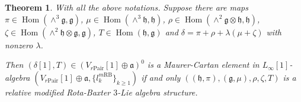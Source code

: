 \documentclass[12pt]{amsart}
\newtheorem{theorem}{Theorem}[section]
\theoremstyle{definition}
\begin{document}
\begin{theorem}\label{Thm: MC of modified relative RB}
	With all the above notations.     Suppose  there are maps $\pi\in \operatorname{Hom}(\wedge^3\mathfrak{g},\mathfrak{g})$, $\mu\in \operatorname{Hom}(\wedge^3\mathfrak{h},\mathfrak{h})$, $\rho\in \operatorname{Hom}(\wedge^2 \mathfrak{g}\otimes \mathfrak{h}  , \mathfrak{h})$, $\zeta\in \operatorname{Hom}(\wedge^2 \mathfrak{h}\otimes \mathfrak{g}  , \mathfrak{g})$, $T\in \operatorname{Hom}(  \mathfrak{h}  , \mathfrak{g})$ and $\delta=\pi+\rho+\lambda(\mu+\zeta)$ with nonzero $\lambda$.
	
	Then $(\delta[1], T)\in (V_{r\mathrm{Pair}}[1] \oplus \mathfrak{a})^0$ is a  Maurer-Cartan element in $L_\infty[1]$-algebra $(V_{r\mathrm{Pair}}[1] \oplus \mathfrak{a}, \{l^{m\mathrm{RB}}_k\}_{k\geq 1} )$ if and only  $\left( \left(\mathfrak{h},\pi\right),\left(\mathfrak{g},\mu\right),\rho,\zeta,T\right) $  is   a relative modified Rota-Baxter $3$-Lie algebra structure.
\end{theorem}
\end{document}
